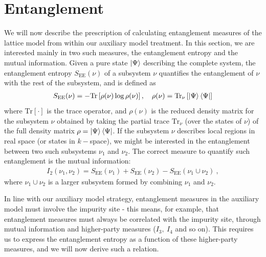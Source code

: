 \documentclass[reprint,hidelinks,onecolumn]{revtex4-2}
\begin{document}
\section{Entanglement}
We will now describe the prescription of calculating entanglement measures of the lattice model from within our auxiliary model treatment. In this section, we are interested mainly in two such measures, the entanglement entropy and the mutual information. Given a pure state \(\ket{\Psi}\) describing the complete system, the entanglement entropy \(S_\text{EE}(\nu)\) of a subsystem \(\nu\) quantifies the entanglement of \(\nu\) with the rest of the subsystem, and is defined as
\begin{equation}\begin{aligned}
	S_\text{EE}(\nu) = -\text{Tr}\left[\rho(\nu)\log \rho(\nu)\right],\quad \rho(\nu) = \text{Tr}_\nu\left[\ket{\Psi}\bra{\Psi}\right] 
\end{aligned}\end{equation}
where \(\text{Tr}\left[\cdot\right] \) is the trace operator, and \(\rho(\nu)\) is the reduced density matrix for the subsystem \(\nu\) obtained by taking the partial trace \(\text{Tr}_\nu\) (over the states of \(\nu\)) of the full density matrix \(\rho = \ket{\Psi}\bra{\Psi}\). If the subsystem \(\nu\) describes local regions in real space (or states in \(k-\)space), we might be interested in the entanglement between two such subsystems \(\nu_1\) and \(\nu_2\). The correct measure to quantify such entanglement is the mutual information:
\begin{equation}\begin{aligned}
	I_2(\nu_1,\nu_2) = S_\text{EE}(\nu_1) + S_\text{EE}(\nu_2) - S_\text{EE}(\nu_1 \cup \nu_2)~,
\end{aligned}\end{equation}
where \(\nu_1 \cup \nu_2\) is a larger subsystem formed by combining \(\nu_1\) and \(\nu_2\).

In line with our auxiliary model strategy, entanglement measures in the auxiliary model must involve the impurity site - this means, for example, that entanglement measures must always be correlated with the impurity site, through mutual information and higher-party measures (\(I_3,~I_4\) and so on). This requires us to express the entanglement entropy as a function of these higher-party measures, and we will now derive such a relation.
\end{document}

